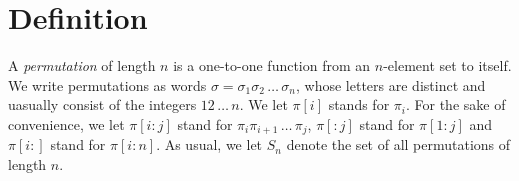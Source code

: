 \documentclass[a4paper]{llncs}
\DeclareMathOperator{\RED}{red}
\newcommand{\ptext}{\pi}
\newcommand{\pmotif}{\sigma}
\begin{document}
%	 
%
%	

	
\section{Definition}
\label{section:Definitions}

A \emph{permutation} of length $n$ is a one-to-one function from an
$n$-element set to itself.
We write permutations as words 
$\sigma = \sigma_1\sigma_2\,\ldots\,\sigma_n$, whose letters are distinct
and uasually consist of the integers $12\,\ldots\,n$.
We let 
$\pi[i]$ stands for $\pi_i$.
For the sake of convenience, we let
$\pi[i:j]$ stand for 
$\pi_i\pi_{i+1}\,\ldots\,\pi_j$,
$\pi[:j]$ stand for $\pi[1:j]$ and
$\pi[i:]$ stand for $\pi[i:n]$.
As usual, we let $S_n$ denote the set of all permutations of length $n$.

\end{document}
